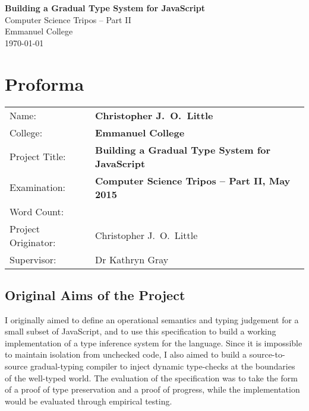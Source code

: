 \documentclass[12pt,a4paper,twoside,openright]{report}
\theoremstyle{definition}
\theoremstyle{dotless}
\begin{document}


\pagestyle{empty}


\vspace*{60mm}
\begin{center}
  \Huge
  \textbf{Building a Gradual Type System for JavaScript} \\[5mm]
  Computer Science Tripos -- Part II \\[5mm]
  Emmanuel College \\[5mm]
  \today  %
\end{center}


\pagestyle{plain}

\chapter*{Proforma}

{\large
  \begin{tabular}{ll}
	Name:               & \bf Christopher J.~O.~Little             \\
	College:            & \bf Emmanuel College                      \\
	Project Title:      & \bf Building a Gradual Type System for JavaScript  \\
	Examination:        & \bf Computer Science Tripos -- Part II, May 2015  \\
	Word Count:         & \bf \footnotemark[1] \\
	Project Originator: & Christopher J.~O.~Little 			\\
	Supervisor:         & Dr Kathryn Gray                   \\ 
  \end{tabular}
}


\section*{Original Aims of the Project}

I originally aimed to define an operational semantics and typing judgement for a
small subset of JavaScript, and to use this specification to build a working
implementation of a type inference system for the language. Since it is impossible
to maintain isolation from unchecked code, I also aimed to build a source-to-source
gradual-typing compiler to inject dynamic type-checks at the boundaries of the well-typed world.
The evaluation of the specification was to take the form of a proof of type
preservation and a proof of progress, while the implementation would be evaluated
through empirical testing.
\end{document}
